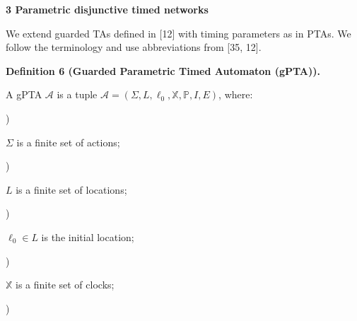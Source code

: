 \documentclass[10pt,a4paper]{article}
\begin{document}
 
 


 
\par\medskip\noindent\textbf{3 Parametric disjunctive timed networks}\par
 
 
We extend guarded TAs defined in [12] with timing parameters as in PTAs. We follow the terminology and use abbreviations from [35, 12].\par
 
 
 
\par\medskip\noindent\textbf{Definition 6 (Guarded Parametric Timed Automaton (gPTA)).}\par
 
 
A gPTA $\mathcal{A}$ is a tuple $\mathcal{A}=(\Sigma,L,\mathrm{\mathrm{\ell}_{0}},\mathbb{X},\mathbb{P},I,E)$, where:\par
  
\par{}) 
 
$\Sigma$ is a finite set of actions;\par
 
 
 
\par{}) 
 
$L$ is a finite set of locations;\par
 
 
 
\par{}) 
 
$\mathrm{\mathrm{\ell}_{0}}\in L$ is the initial location;\par
 
 
 
\par{}) 
 
$\mathbb{X}$ is a finite set of clocks;\par
 
 
 
\par{}) 
 
\end{document}

